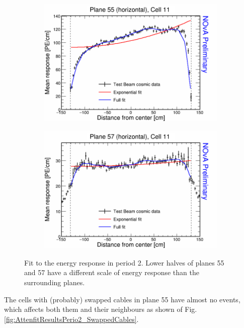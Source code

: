 \begin{figure}[h]
  \begin{subfigure}{0.5\textwidth}
    \includegraphics[width=\linewidth]{RelativeCalibrationResults/p2_055_011.png}
  \end{subfigure}
  \begin{subfigure}{0.5\textwidth}
    \includegraphics[width=\linewidth]{RelativeCalibrationResults/p2_057_011.png}
  \end{subfigure}
  \caption{Fit to the energy response in period 2. Lower halves of planes 55 and 57 have a different scale of energy response than the surrounding planes.}
  \label{fig:AttenfitResultsPerio2_FaultyFEB}
\end{figure}

The cells with (probably) swapped cables in plane 55 have almost no events, which affects both them and their neighbours as shown of Fig. \ref{fig:AttenfitResultsPerio2_SwappedCables}.

